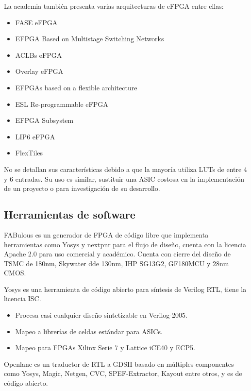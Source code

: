 La academia también presenta varias arquitecturas de eFPGA entre ellas:

\begin{itemize}
    \item FASE eFPGA
    \item EFPGA Based on Multistage Switching Networks
    \item ACLBs eFPGA
    \item Overlay eFPGA
    \item EFPGAs based on a flexible architecture
    \item ESL Re-programmable eFPGA
    \item EFPGA Subsystem
    \item LIP6 eFPGA
    \item FlexTiles
\end{itemize}

No se detallan sus características debido a que la mayoría utiliza LUTs de entre 4 y
6 entradas. Su uso es similar, sustituir una ASIC costosa en la implementación de un
proyecto o para investigación de su desarrollo.\cite{saidi2018survey}

\subsection{Herramientas de software}

FABulous es un generador de FPGA de código libre que implementa herramientas como
Yosys y nextpnr para el flujo de diseño, cuenta con la licencia Apache 2.0 para uso
comercial y académico. Cuenta con cierre del diseño de TSMC de 180nm, Skywater dde
130nm, IHP SG13G2, GF180MCU y 28nm CMOS.\cite{fabulous2024}

Yosys es una herramienta de código abierto para síntesis de Verilog RTL, tiene la licencia
ISC.\cite{wolf2024yosys}

\begin{itemize}

    \item Procesa casi cualquier diseño sintetizable en Verilog-2005.
    \item Mapeo a librerías de celdas estándar para ASICs.
    \item Mapeo para FPGAs Xilinx Serie 7 y Lattice iCE40 y ECP5.
    
\end{itemize}

Openlane es un traductor de RTL a GDSII basado en múltiples componentes como Yosys,
Magic, Netgen, CVC, SPEF-Extractor, Kayout entre otros, y es de código abierto. \cite{openlane}

